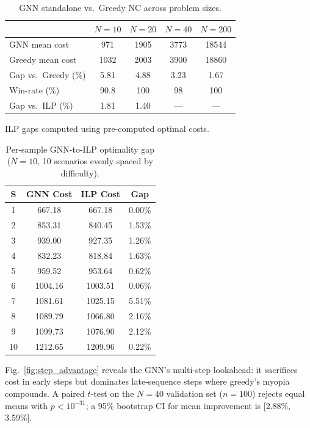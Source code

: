 \documentclass[conference]{IEEEtran}
\begin{document}
\begin{table}[htbp]
\caption{GNN standalone vs.\ Greedy NC across problem sizes.}
\label{tab:cross_size}
\centering
\begin{tabular}{@{}lcccc@{}}
\toprule
& $N{=}10$ & $N{=}20$ & $N{=}40$ & $N{=}200$ \\
\midrule
GNN mean cost        & 971   & 1905  & 3773  & 18544 \\
Greedy mean cost     & 1032  & 2003  & 3900  & 18860 \\
Gap vs.\ Greedy (\%)     & 5.81  & 4.88  & 3.23  & 1.67 \\
Win-rate (\%)        & 90.8    & 100   & 98    & 100 \\
Gap vs.\ ILP (\%)   & 1.81  & 1.40  & ---   & --- \\
\bottomrule
\end{tabular}
\vspace{1mm}

\footnotesize ILP gaps computed using pre-computed optimal costs.
\end{table}

\begin{table}[htbp]
\caption{Per-sample GNN-to-ILP optimality gap ($N{=}10$, 10 scenarios evenly spaced by difficulty).}
\label{tab:ilp_gap}
\centering
\begin{tabular}{@{}cccc@{}}
\toprule
\textbf{S} & \textbf{GNN Cost} & \textbf{ILP Cost} & \textbf{Gap} \\
\midrule
1  & 667.18 & 667.18 & 0.00\% \\
2  & 853.31 & 840.45 & 1.53\% \\
3  & 939.00 & 927.35 & 1.26\% \\
4  & 832.23 & 818.84 & 1.63\% \\
5  & 959.52 & 953.64 & 0.62\% \\
6  & 1004.16 & 1003.51 & 0.06\% \\
7  & 1081.61 & 1025.15 & 5.51\% \\
8  & 1089.79 & 1066.80 & 2.16\% \\
9  & 1099.73 & 1076.90 & 2.12\% \\
10 & 1212.65 & 1209.96 & 0.22\% \\
\bottomrule
\end{tabular}
\end{table}

Fig.~\ref{fig:step_advantage} reveals the GNN's multi-step lookahead: it sacrifices cost in early steps but dominates late-sequence steps where greedy's myopia compounds. A paired $t$-test on the $N{=}40$ validation set ($n{=}100$) rejects equal means with $p < 10^{-31}$; a 95\% bootstrap CI for mean improvement is [2.88\%, 3.59\%].
\end{document}
